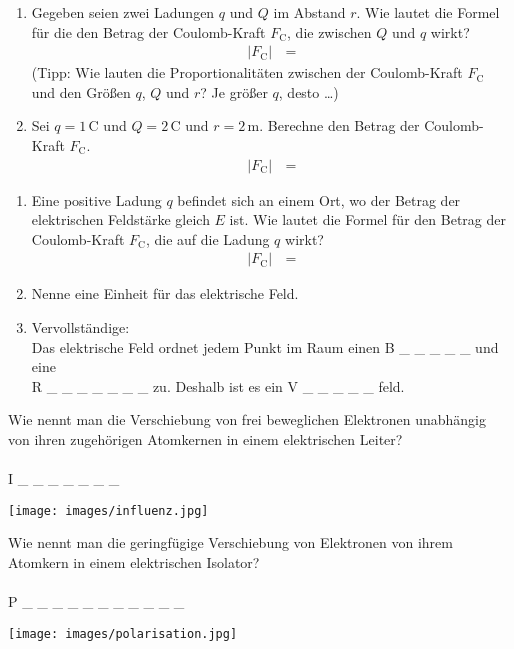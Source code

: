 \documentclass[task=1]{exercise}
\begin{document}
  \begin{enumerate}[label=\textnormal{\alph*)}]
    \item Gegeben seien zwei Ladungen $q$ und $Q$ im Abstand $r$. Wie lautet die Formel f\"ur die den Betrag der Coulomb-Kraft $F_\mathrm{C}$, die zwischen $Q$ und $q$ wirkt?
    \begin{align*}
      \left| F_\mathrm{C} \right| \, &=
    \end{align*}
    (Tipp: Wie lauten die Proportionalit\"aten zwischen der Coulomb-Kraft $F_\mathrm{C}$ und den Gr\"o{\ss}en $q$, $Q$ und $r$? Je gr\"o{\ss}er $q$, desto \ldots)
    \item Sei $q = 1\,\mathrm{C}$ und $Q = 2\,\mathrm{C}$ und $r = 2\,\mathrm{m}$. Berechne den Betrag der Coulomb-Kraft $F_\mathrm{C}$.
    \begin{align*}
      \left| F_\mathrm{C} \right| \, &=
    \end{align*}
  \end{enumerate}
  
  \begin{enumerate}[label=\textnormal{\alph*)}]
    \item Eine positive Ladung $q$ befindet sich an einem Ort, wo der Betrag der elektrischen Feldst\"arke gleich $E$ ist. Wie lautet die Formel f\"ur den Betrag der Coulomb-Kraft $F_\mathrm{C}$, die auf die Ladung $q$ wirkt?
    \begin{align*}
      \left| F_\mathrm{C} \right| \, &=
    \end{align*}
    \item Nenne eine Einheit f\"ur das elektrische Feld.\\
    \item Vervollst\"andige:\\
    Das elektrische Feld ordnet jedem Punkt im Raum einen B \_ \_ \_ \_ \_ und eine\\
    R \_ \_ \_ \_ \_ \_ \_ zu. Deshalb ist es ein V \_ \_ \_ \_ \_ feld.
  \end{enumerate}
  
  \task[Ph\"anomene]
    \begin{minipage}{.45\linewidth}
    Wie nennt man die Verschiebung von frei beweglichen Elektronen unabhängig von ihren zugehörigen Atomkernen in einem elektrischen Leiter?\\~\\
     I \_ \_ \_ \_ \_ \_ \_
    \end{minipage}\hfill
    \begin{minipage}{.4\linewidth}
     \texttt{[image: images/influenz.jpg]}
    \end{minipage}
    \begin{minipage}{.45\linewidth}
    Wie nennt man die geringfügige Verschiebung von Elektronen von ihrem Atomkern in einem elektrischen Isolator?\\~\\
        P \_ \_ \_ \_ \_ \_ \_ \_ \_ \_ \_
    \end{minipage}\hfill
    \begin{minipage}{.4\linewidth}
     \texttt{[image: images/polarisation.jpg]}
    \end{minipage}  
  
\end{document}

